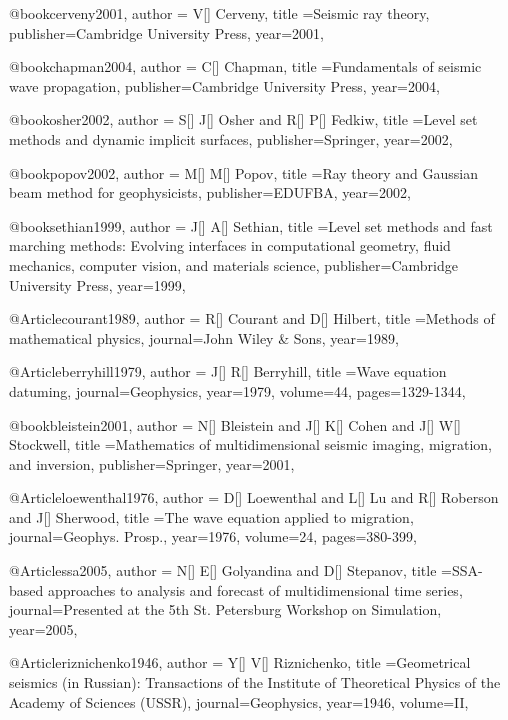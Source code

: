 @book{cerveny2001,
  author = {V[] Cerveny},
  title ={Seismic ray theory},
  publisher={Cambridge University Press},
  year=2001,
}

@book{chapman2004,
  author = {C[] Chapman},
  title ={Fundamentals of seismic wave propagation},
  publisher={Cambridge University Press},
  year=2004,
}

@book{osher2002,
  author = {S[] J[] Osher and R[] P[] Fedkiw},
  title ={Level set methods and dynamic implicit surfaces},
  publisher={Springer},
  year=2002,
}

@book{popov2002,
  author = {M[] M[] Popov},
  title ={Ray theory and Gaussian beam method for geophysicists},
  publisher={EDUFBA},
  year=2002,
}

@book{sethian1999,
  author = {J[] A[] Sethian},
  title ={Level set methods and fast marching methods: Evolving interfaces in computational geometry, fluid mechanics, computer vision, and materials science},
  publisher={Cambridge University Press},
  year=1999,
}

@Article{courant1989,
  author = {R[] Courant and D[] Hilbert},
  title ={Methods of mathematical physics},
  journal={John Wiley \& Sons},
  year=1989,
}

@Article{berryhill1979,
  author = {J[] R[] Berryhill},
  title ={Wave equation datuming},
  journal={Geophysics},
  year=1979,
  volume=44,
  pages={1329-1344},
}

@book{bleistein2001,
  author = {N[] Bleistein and J[] K[] Cohen and J[] W[] Stockwell},
  title ={Mathematics of multidimensional seismic imaging, migration, and inversion},
  publisher={Springer},
  year=2001,
}

@Article{loewenthal1976,
  author = {D[] Loewenthal and L[] Lu and R[] Roberson and J[] Sherwood},
  title ={The wave equation applied to migration},
  journal={Geophys. Prosp.},
  year=1976,
  volume=24,
  pages={380-399},
}

@Article{ssa2005,
  author = {N[] E[] Golyandina and D[] Stepanov},
  title ={SSA-based approaches to analysis and forecast of multidimensional time series},
  journal={Presented at the 5th St. Petersburg Workshop on Simulation},
  year=2005,
}



@Article{riznichenko1946,
  author = {Y[] V[] Riznichenko},
  title ={Geometrical seismics (in Russian): Transactions of the Institute of Theoretical Physics of the Academy of Sciences (USSR)},
  journal={Geophysics},
  year=1946,
  volume=II,
}

